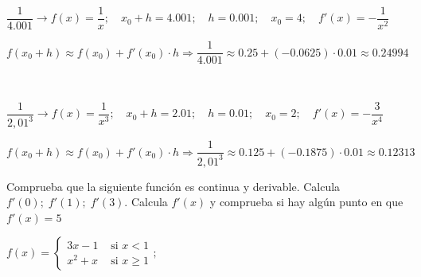 	\begin{proofw}\renewcommand{\qedsymbol}{$\diamond$}
	
	$\dfrac 1 {4.001} \to f(x)=\dfrac 1 x;\quad x_0+h=4.001;\quad h=0.001; \quad x_0=4; \quad f'(x)=-\dfrac 1 {x^2}$
	
	$f(x_0+h) \approx f(x_0)+f'(x_0) \cdot h \Rightarrow \dfrac 1 {4.001} \approx 0.25 + (-0.0625)\cdot 0.01 \approx 0.24994$
	
	$\quad$
	
	$\dfrac {1}{2,01^3} \to f(x)=\dfrac 1 {x^3};\quad x_0+h=2.01;\quad h=0.01; \quad x_0=2; \quad f'(x)=-\dfrac 3 {x^4}$
	
	$f(x_0+h) \approx f(x_0)+f'(x_0) \cdot h \Rightarrow \dfrac 1 {2,01^3} \approx 0.125 + (-0.1875)\cdot 0.01 \approx 0.12313$
	\end{proofw}

	\begin{ejre} 	Comprueba que la siguiente función es continua y derivable. Calcula $f'(0);\; f'(1);\; f'(3)$. Calcula $f'(x)$ y comprueba si hay algún punto en que $f'(x)=5$
	
			$f(x)=
		\begin{cases}
		3x-1 & \mbox{ si } x< 1 \\
		x^2+x & \mbox{ si } x\ge 1  
		\end{cases} ;$
	\end{ejre}
	

